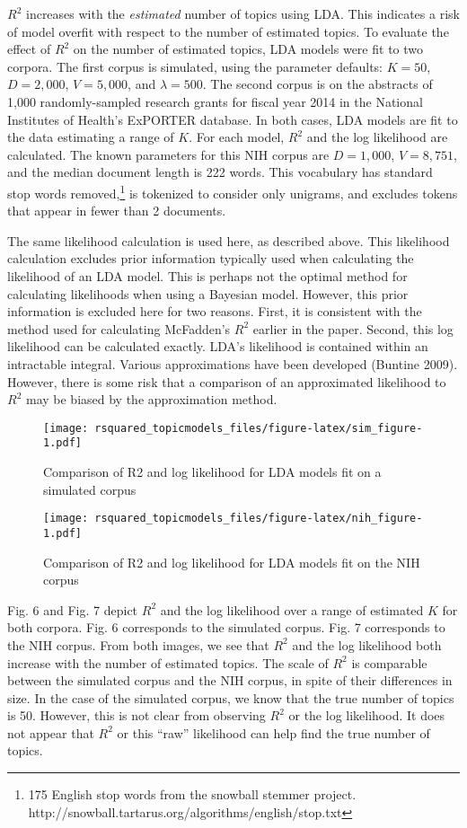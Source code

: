 \documentclass[conference,final,]{IEEEtran}
\makeatletter
\def\maxwidth{\ifdim\Gin@nat@width>\linewidth\linewidth
\else\Gin@nat@width\fi}
\let\Oldincludegraphics\includegraphics
\renewcommand{\includegraphics}[1]{\Oldincludegraphics[width=\maxwidth]{#1}}
\makeatother
\begin{document}
\(R^2\) increases with the \textit{estimated} number of topics using
LDA. This indicates a risk of model overfit with respect to the number
of estimated topics. To evaluate the effect of \(R^2\) on the number of
estimated topics, LDA models were fit to two corpora. The first corpus
is simulated, using the parameter defaults: \(K = 50\), \(D = 2{,}000\),
\(V = 5{,}000\), and \(\lambda = 500\). The second corpus is on the
abstracts of 1,000 randomly-sampled research grants for fiscal year 2014
in the National Institutes of Health's ExPORTER database. In both cases,
LDA models are fit to the data estimating a range of \(K\). For each
model, \(R^2\) and the log likelihood are calculated. The known
parameters for this NIH corpus are \(D = 1{,}000\), \(V = 8,751\), and
the median document length is 222 words. This vocabulary has standard
stop words removed,\footnote{175 English stop words from the snowball
  stemmer project.
  http://snowball.tartarus.org/algorithms/english/stop.txt} is tokenized
to consider only unigrams, and excludes tokens that appear in fewer than
2 documents.

The same likelihood calculation is used here, as described above. This
likelihood calculation excludes prior information typically used when
calculating the likelihood of an LDA model. This is perhaps not the
optimal method for calculating likelihoods when using a Bayesian model.
However, this prior information is excluded here for two reasons. First,
it is consistent with the method used for calculating McFadden's \(R^2\)
earlier in the paper. Second, this log likelihood can be calculated
exactly. LDA's likelihood is contained within an intractable integral.
Various approximations have been developed (Buntine 2009). However,
there is some risk that a comparison of an approximated likelihood to
\(R^2\) may be biased by the approximation method.

\begin{figure}
\centering
\texttt{[image: rsquared\_topicmodels\_files/figure-latex/sim\_figure-1.pdf]}
\caption{Comparison of R2 and log likelihood for LDA models fit on a
simulated corpus}
\end{figure}

\begin{figure}
\centering
\texttt{[image: rsquared\_topicmodels\_files/figure-latex/nih\_figure-1.pdf]}
\caption{Comparison of R2 and log likelihood for LDA models fit on the
NIH corpus}
\end{figure}

Fig. 6 and Fig. 7 depict \(R^2\) and the log likelihood over a range of
estimated \(K\) for both corpora. Fig. 6 corresponds to the simulated
corpus. Fig. 7 corresponds to the NIH corpus. From both images, we see
that \(R^2\) and the log likelihood both increase with the number of
estimated topics. The scale of \(R^2\) is comparable between the
simulated corpus and the NIH corpus, in spite of their differences in
size. In the case of the simulated corpus, we know that the true number
of topics is 50. However, this is not clear from observing \(R^2\) or
the log likelihood. It does not appear that \(R^2\) or this ``raw''
likelihood can help find the true number of topics.
\end{document}
